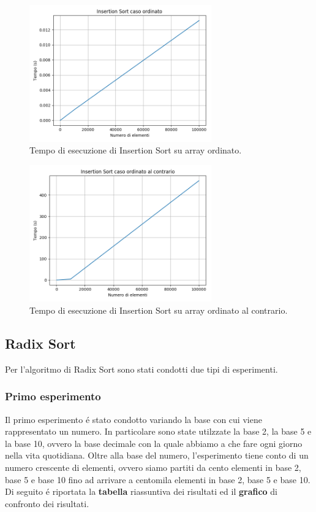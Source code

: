 \documentclass[a4paper]{article}
\begin{document}
\begin{figure}[h]
    \centering
    \captionsetup{justification=centering,margin=1.0cm}
    \includegraphics[width=0.7\textwidth]{IS_ordinato}
    \caption{Tempo di esecuzione di Insertion Sort su array ordinato.}
    \label{fig:test2_1}
\end{figure}

\begin{figure}[h]
    \centering
    \captionsetup{justification=centering,margin=1.0cm}
    \includegraphics[width=0.7\textwidth]{IS_ordincontr}
    \caption{Tempo di esecuzione di Insertion Sort su array ordinato al contrario.}
    \label{fig:test2_1}
\end{figure}
\clearpage

\subsection{Radix Sort}
Per l'algoritmo di Radix Sort sono stati condotti due tipi di esperimenti.
\newline
\subsubsection{Primo esperimento}
Il primo esperimento \'e stato condotto variando la base con cui viene rappresentato un numero. In particolare sono state utilzzate la base 2, la base 5 e la base 10, ovvero la base decimale con la quale abbiamo a che fare ogni giorno nella vita quotidiana. Oltre alla base del numero, l'esperimento tiene conto di un numero crescente di elementi, ovvero siamo partiti da cento elementi in base 2, base 5 e base 10 fino ad arrivare a centomila elementi in base 2, base 5 e base 10. 
\newline
Di seguito \'e riportata la \textbf{tabella} riassuntiva dei risultati ed il \textbf{grafico} di confronto dei risultati.
\end{document}
